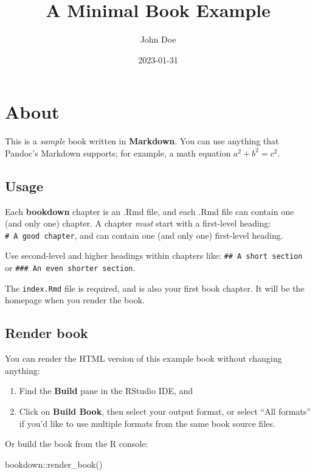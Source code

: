\documentclass[
]{book}
\title{A Minimal Book Example}
\author{John Doe}
\date{2023-01-31}
\newenvironment{Shaded}{\begin{snugshade}}{\end{snugshade}}
\newcommand{\FunctionTok}[1]{\textcolor[rgb]{0.00,0.00,0.00}{#1}}
\newcommand{\NormalTok}[1]{#1}
\newcommand{\SpecialCharTok}[1]{\textcolor[rgb]{0.00,0.00,0.00}{#1}}
\begin{document}
\maketitle

{
\setcounter{tocdepth}{1}
\tableofcontents
}
\hypertarget{about}{%
\chapter{About}\label{about}}

This is a \emph{sample} book written in \textbf{Markdown}. You can use anything that Pandoc's Markdown supports; for example, a math equation \(a^2 + b^2 = c^2\).

\hypertarget{usage}{%
\section{Usage}\label{usage}}

Each \textbf{bookdown} chapter is an .Rmd file, and each .Rmd file can contain one (and only one) chapter. A chapter \emph{must} start with a first-level heading: \texttt{\#\ A\ good\ chapter}, and can contain one (and only one) first-level heading.

Use second-level and higher headings within chapters like: \texttt{\#\#\ A\ short\ section} or \texttt{\#\#\#\ An\ even\ shorter\ section}.

The \texttt{index.Rmd} file is required, and is also your first book chapter. It will be the homepage when you render the book.

\hypertarget{render-book}{%
\section{Render book}\label{render-book}}

You can render the HTML version of this example book without changing anything:

\begin{enumerate}
\def\labelenumi{\arabic{enumi}.}
\item
  Find the \textbf{Build} pane in the RStudio IDE, and
\item
  Click on \textbf{Build Book}, then select your output format, or select ``All formats'' if you'd like to use multiple formats from the same book source files.
\end{enumerate}

Or build the book from the R console:

\begin{Shaded}
\begin{Highlighting}[]
\NormalTok{bookdown}\SpecialCharTok{::}\FunctionTok{render\_book}\NormalTok{()}
\end{Highlighting}
\end{Shaded}
\end{document}
